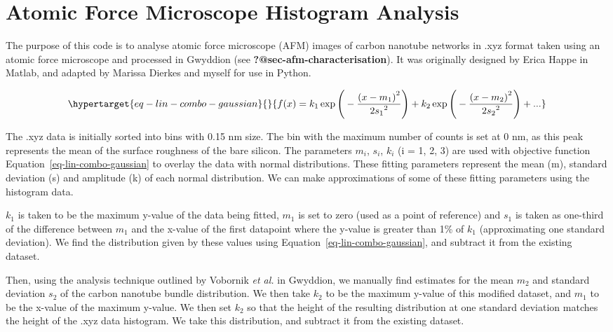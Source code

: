 \documentclass[
  a4paper,
]{scrbook}
\begin{document}
\hypertarget{sec-histogram-analysis}{%
\section{Atomic Force Microscope Histogram
Analysis}\label{sec-histogram-analysis}}

The purpose of this code is to analyse atomic force microscope (AFM)
images of carbon nanotube networks in .xyz format taken using an atomic
force microscope and processed in Gwyddion (see
\textbf{?@sec-afm-characterisation}). It was originally designed by
Erica Happe in Matlab, and adapted by Marissa Dierkes and myself for use
in Python.

\begin{equation}\protect\hypertarget{eq-lin-combo-gaussian}{}{
f(x) = k_1\exp{\Bigg(-\frac{{(x-m_1)}^{2}}{{2s_1}^{2}}\Bigg)} + k_2\exp{\Bigg(-\frac{{(x-m_2)}^{2}}{{2s_2}^{2}}\Bigg)} + ...
}\label{eq-lin-combo-gaussian}\end{equation}

The .xyz data is initially sorted into bins with 0.15 nm size. The bin
with the maximum number of counts is set at 0 nm, as this peak
represents the mean of the surface roughness of the bare silicon. The
parameters \(m_i\), \(s_i\), \(k_i\) (i = 1, 2, 3) are used with
objective function Equation~\ref{eq-lin-combo-gaussian} to overlay the
data with normal distributions. These fitting parameters represent the
mean (m), standard deviation (s) and amplitude (k) of each normal
distribution. We can make approximations of some of these fitting
parameters using the histogram data.

\(k_1\) is taken to be the maximum y-value of the data being fitted,
\(m_1\) is set to zero (used as a point of reference) and \(s_1\) is
taken as one-third of the difference between \(m_1\) and the x-value of
the first datapoint where the y-value is greater than 1\% of \(k_1\)
(approximating one standard deviation). We find the distribution given
by these values using Equation~\ref{eq-lin-combo-gaussian}, and subtract
it from the existing dataset.

Then, using the analysis technique outlined by Vobornik \emph{et al.}
\autocite{Vobornik2023} in Gwyddion, we manually find estimates for the
mean \(m_2\) and standard deviation \(s_2\) of the carbon nanotube
bundle distribution. We then take \(k_2\) to be the maximum y-value of
this modified dataset, and \(m_1\) to be the x-value of the maximum
y-value. We then set \(k_2\) so that the height of the resulting
distribution at one standard deviation matches the height of the .xyz
data histogram. We take this distribution, and subtract it from the
existing dataset.
\end{document}
